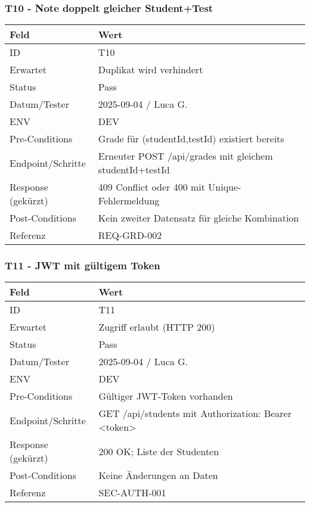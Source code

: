 \documentclass[12pt,a4paper]{article}
\begin{document}
    \subsubsection{T10 - Note doppelt gleicher Student+Test}
    {\small
        \begin{tabularx}{\textwidth}{|p{3.2cm}|X|}
            \hline
            \textbf{Feld} & \textbf{Wert} \\ \hline
            ID & T10 \\ \hline
            Erwartet & Duplikat wird verhindert \\ \hline
            Status & Pass \\ \hline
            Datum/Tester & 2025-09-04 / Luca G. \\ \hline
            ENV & DEV \\ \hline
            Pre-Conditions & Grade für (studentId,testId) existiert bereits \\ \hline
            Endpoint/Schritte & Erneuter POST /api/grades mit gleichem studentId+testId \\ \hline
            Response (gekürzt) & 409 Conflict oder 400 mit Unique-Fehlermeldung \\ \hline
            Post-Conditions & Kein zweiter Datensatz für gleiche Kombination \\ \hline
            Referenz & REQ-GRD-002 \\ \hline
        \end{tabularx}
    }

    \subsubsection{T11 - JWT mit gültigem Token}
    {\small
        \begin{tabularx}{\textwidth}{|p{3.2cm}|X|}
            \hline
            \textbf{Feld} & \textbf{Wert} \\ \hline
            ID & T11 \\ \hline
            Erwartet & Zugriff erlaubt (HTTP 200) \\ \hline
            Status & Pass \\ \hline
            Datum/Tester & 2025-09-04 / Luca G. \\ \hline
            ENV & DEV \\ \hline
            Pre-Conditions & Gültiger JWT-Token vorhanden \\ \hline
            Endpoint/Schritte & GET /api/students mit Authorization: Bearer <token> \\ \hline
            Response (gekürzt) & 200 OK; Liste der Studenten \\ \hline
            Post-Conditions & Keine Änderungen an Daten \\ \hline
            Referenz & SEC-AUTH-001 \\ \hline
        \end{tabularx}
    }
\end{document}
